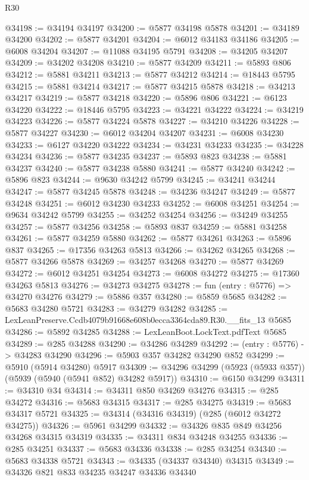 \begin{lexlean}{R30}
\begin{coremodule}
@34198 := @34194 @34197
@34200 := @5877 @34198 @5878
@34201 := @34189 @34200
@34202 := @5877 @34201
@34204 := @6012 @34183 @34186
@34205 := @6008 @34204
@34207 := @11088 @34195 @5791
@34208 := @34205 @34207
@34209 := @34202 @34208
@34210 := @5877 @34209
@34211 := @5893 @806
@34212 := @5881 @34211
@34213 := @5877 @34212
@34214 := @18443 @5795
@34215 := @5881 @34214
@34217 := @5877 @34215 @5878
@34218 := @34213 @34217
@34219 := @5877 @34218
@34220 := @5896 @806
@34221 := @6123 @34220
@34222 := @18446 @5795
@34223 := @34221 @34222
@34224 := @34219 @34223
@34226 := @5877 @34224 @5878
@34227 := @34210 @34226
@34228 := @5877 @34227
@34230 := @6012 @34204 @34207
@34231 := @6008 @34230
@34233 := @6127 @34220 @34222
@34234 := @34231 @34233
@34235 := @34228 @34234
@34236 := @5877 @34235
@34237 := @5893 @823
@34238 := @5881 @34237
@34240 := @5877 @34238 @5880
@34241 := @5877 @34240
@34242 := @5896 @823
@34244 := @9630 @34242 @5799
@34245 := @34241 @34244
@34247 := @5877 @34245 @5878
@34248 := @34236 @34247
@34249 := @5877 @34248
@34251 := @6012 @34230 @34233
@34252 := @6008 @34251
@34254 := @9634 @34242 @5799
@34255 := @34252 @34254
@34256 := @34249 @34255
@34257 := @5877 @34256
@34258 := @5893 @837
@34259 := @5881 @34258
@34261 := @5877 @34259 @5880
@34262 := @5877 @34261
@34263 := @5896 @837
@34265 := @17356 @34263 @5813
@34266 := @34262 @34265
@34268 := @5877 @34266 @5878
@34269 := @34257 @34268
@34270 := @5877 @34269
@34272 := @6012 @34251 @34254
@34273 := @6008 @34272
@34275 := @17360 @34263 @5813
@34276 := @34273 @34275
@34278 := fun (entry : @5776) => @34270 @34276
@34279 := @5886 @357
@34280 := @5859 @5685
@34282 := @5683 @34280 @5721
@34283 := @34279 @34282
@34285 := LexLeanPreserve.Ccdb4079b91668e608b0ecca3364cda89.R30.__fits_13 @5685
@34286 := @5892 @34285
@34288 := LexLeanBoot.LockText.pdfText @5685
@34289 := @285 @34288
@34290 := @34286 @34289
@34292 := (entry : @5776) -> @34283 @34290
@34296 := @5903 @357 @34282 @34290 @852
@34299 := @5910 (@5914 @34280) @5917
@34309 := @34296 @34299 (@5923 (@5933 @357)) (@5939 (@5940 (@5941 @852) @34282 @5917))
@34310 := @6150 @34299
@34311 := @34310 @34
@34314 := @34311 @850 @34269 @34276
@34315 := @285 @34272
@34316 := @5683 @34315
@34317 := @285 @34275
@34319 := @5683 @34317 @5721
@34325 := @34314 (@34316 @34319) (@285 (@6012 @34272 @34275))
@34326 := @5961 @34299
@34332 := @34326 @835 @849 @34256 @34268 @34315 @34319
@34335 := @34311 @834 @34248 @34255
@34336 := @285 @34251
@34337 := @5683 @34336
@34338 := @285 @34254
@34340 := @5683 @34338 @5721
@34343 := @34335 (@34337 @34340) @34315
@34349 := @34326 @821 @833 @34235 @34247 @34336 @34340

\end{coremodule}
\end{lexlean}
